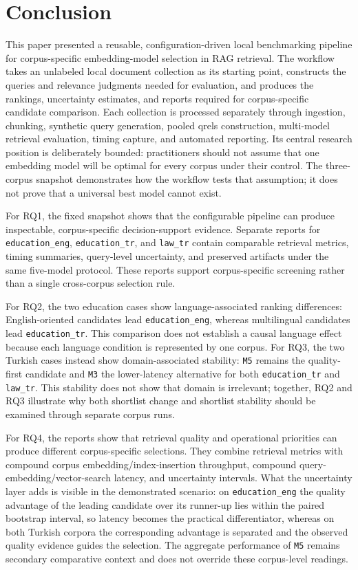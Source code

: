\section{Conclusion}\label{conclusion}

This paper presented a reusable, configuration-driven local benchmarking pipeline for corpus-specific embedding-model selection in RAG retrieval. The workflow takes an unlabeled local document collection as its starting point, constructs the queries and relevance judgments needed for evaluation, and produces the rankings, uncertainty estimates, and reports required for corpus-specific candidate comparison. Each collection is processed separately through ingestion, chunking, synthetic query generation, pooled qrels construction, multi-model retrieval evaluation, timing capture, and automated reporting. Its central research position is deliberately bounded: practitioners should not assume that one embedding model will be optimal for every corpus under their control. The three-corpus snapshot demonstrates how the workflow tests that assumption; it does not prove that a universal best model cannot exist.

For RQ1, the fixed snapshot shows that the configurable pipeline can produce inspectable, corpus-specific decision-support evidence. Separate reports for \texttt{education\_eng}, \texttt{education\_tr}, and \texttt{law\_tr} contain comparable retrieval metrics, timing summaries, query-level uncertainty, and preserved artifacts under the same five-model protocol. These reports support corpus-specific screening rather than a single cross-corpus selection rule.

For RQ2, the two education cases show language-associated ranking differences: English-oriented candidates lead \texttt{education\_eng}, whereas multilingual candidates lead \texttt{education\_tr}. This comparison does not establish a causal language effect because each language condition is represented by one corpus. For RQ3, the two Turkish cases instead show domain-associated stability: \texttt{M5} remains the quality-first candidate and \texttt{M3} the lower-latency alternative for both \texttt{education\_tr} and \texttt{law\_tr}. This stability does not show that domain is irrelevant; together, RQ2 and RQ3 illustrate why both shortlist change and shortlist stability should be examined through separate corpus runs.

For RQ4, the reports show that retrieval quality and operational priorities can produce different corpus-specific selections. They combine retrieval metrics with compound corpus embedding/index-insertion throughput, compound query-embedding/vector-search latency, and uncertainty intervals. What the uncertainty layer adds is visible in the demonstrated scenario: on \texttt{education\_eng} the quality advantage of the leading candidate over its runner-up lies within the paired bootstrap interval, so latency becomes the practical differentiator, whereas on both Turkish corpora the corresponding advantage is separated and the observed quality evidence guides the selection. The aggregate performance of \texttt{M5} remains secondary comparative context and does not override these corpus-level readings.

